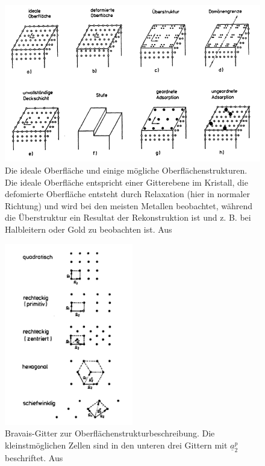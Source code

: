 \begin{figure}
    \includegraphics[width=1.0\textwidth]{pics/oberflaechenstruktur}
    \caption{Die ideale Oberfläche und einige mögliche Oberflächenstrukturen. 
Die ideale Oberfläche entspricht einer Gitterebene im Kristall, die defomierte 
Oberfläche entsteht durch Relaxation (hier in normaler Richtung) und wird bei den 
meisten Metallen beobachtet, während die Überstruktur ein Resultat der Rekonstruktion 
ist und z. B. bei Halbleitern oder Gold zu beobachten ist. 
Aus \cite{henzler1991oberflachenphysik} }
    \label{fig:oberflaeche}
\end{figure} 
\begin{figure}
    \includegraphics[width=0.5\textwidth]{pics/Bravais}
    \caption{Bravais-Gitter zur Oberflächenstrukturbeschreibung. Die kleinstmöglichen
Zellen sind in den unteren drei Gittern mit $\underline{a}_2^p$ beschriftet. 
Aus \cite{henzler1991oberflachenphysik} }
    \label{fig:Bravais}
\end{figure} 


